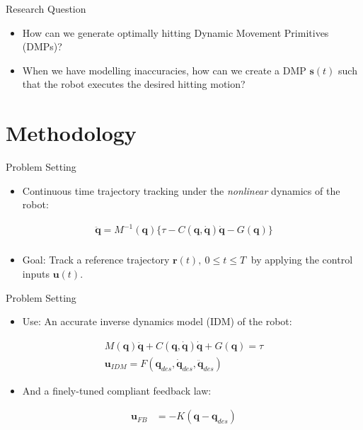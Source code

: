 \documentclass[handout]{beamer}
\newcommand{\joint}{\mathbf{q}} %
\newcommand{\traj}{\mathbf{r}} %
\newcommand{\dmp}{\mathbf{s}} %
\newcommand{\sysInput}{\mathbf{u}} %
\begin{document}
%
\begin{frame}{Research Question}
\begin{itemize}
\item How can we generate optimally hitting Dynamic Movement Primitives (DMPs)? \pause
\item When we have modelling inaccuracies, how can we create a DMP $\dmp(t)$ such that the robot executes the desired hitting motion?
\end{itemize}
\end{frame}
%
\section{Methodology}
%
\begin{frame}{Problem Setting}
\begin{itemize}
\item Continuous time trajectory tracking under the \emph{nonlinear} dynamics of the robot: \pause
\end{itemize}
\begin{equation*}
\begin{aligned}
\ddot{\joint} = M^{-1}(\joint)\{ \tau - C(\joint,\dot{\joint})\dot{\joint} - G(\joint) \}\\
\end{aligned}
\end{equation*} \pause
\begin{itemize}
\item Goal: Track a reference trajectory $\traj(t), \ 0 \leq t \leq T \ $ by applying the control inputs $\sysInput(t)$.
\end{itemize}
\end{frame}
%
\begin{frame}{Problem Setting}
\begin{itemize}
\item Use: An accurate inverse dynamics model (IDM) of the robot: \pause
\end{itemize}
\begin{equation*}
\begin{aligned}
M(\joint)\ddot{\joint} + C(\joint,\dot{\joint})\dot{\joint} + G(\joint) = \tau \\
\sysInput_{IDM} = F(\joint_{des},\dot{\joint}_{des},\ddot{\joint}_{des})
\end{aligned}
\end{equation*}
\pause 
\begin{itemize}
\item And a finely-tuned compliant feedback law: \pause
\end{itemize}
\begin{equation*}
\begin{aligned}
\sysInput_{FB} &= -K(\joint - \joint_{des})
\end{aligned}
\end{equation*}
\end{frame}
\end{document}
